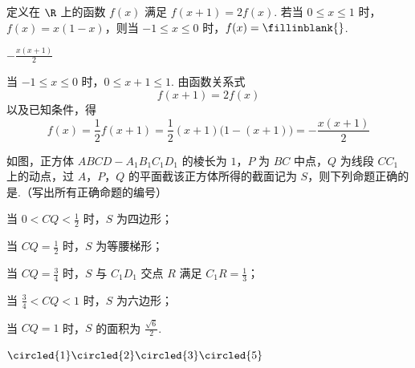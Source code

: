 \begin{problem}
定义在 \(\R\) 上的函数 \(f(x)\) 满足 \(f(x + 1) = 2f(x)\). 若当 \(0 \leqslant x \leqslant 1\) 时，\(f(x) = x(1 - x)\)，则当 \(-1 \leqslant x \leqslant 0\) 时，\(f(x) =\fillinblank{}\).
\end{problem}

\begin{answer}
\(-\frac{x(x+1)}{2}\)
\end{answer}

\begin{solution}
当 \(-1\leqslant x\leqslant0\) 时，\(0\leqslant x+1\leqslant1\). 由函数关系式
\[
f(x+1)=2f(x)
\]
以及已知条件，得
\[
f(x)=\frac12f(x+1)=\frac12(x+1)\bigl(1-(x+1)\bigr)=-\frac{x(x+1)}2
\]
\end{solution}

\begin{problem}
如图，正方体 \(ABCD - A_{1}B_{1}C_{1}D_{1}\) 的棱长为 \(1\)，\(P\) 为 \(BC\) 中点，\(Q\) 为线段 \(CC_{1}\) 上的动点，过 \(A\)，\(P\)，\(Q\) 的平面截该正方体所得的截面记为 \(S\)，则下列命题正确的是\fillinblank{}.（写出所有正确命题的编号）


\begin{circlelist}
\item 当 \(0 < CQ < \frac{1}{2}\) 时，\(S\) 为四边形；
\item 当 \(CQ = \frac{1}{2}\) 时，\(S\) 为等腰梯形；
\item 当 \(CQ = \frac{3}{4}\) 时，\(S\) 与 \(C_1D_1\) 交点 \(R\) 满足 \(C_1R = \frac{1}{3}\)；
\item 当 \(\frac{3}{4} < CQ < 1\) 时，\(S\) 为六边形；
\item 当 \(CQ = 1\) 时，\(S\) 的面积为 \(\frac{\sqrt{6}}{2}\).
\end{circlelist}
\end{problem}

\begin{answer}
\(\circled{1}\circled{2}\circled{3}\circled{5}\)
\end{answer}

